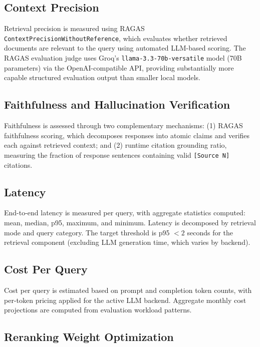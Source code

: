 \documentclass[12pt,a4paper]{report}
\begin{document}
\subsection{Context Precision}

Retrieval precision is measured using RAGAS \texttt{ContextPrecisionWithoutReference}, which evaluates whether retrieved documents are relevant to the query using automated LLM-based scoring. The RAGAS evaluation judge uses Groq's \texttt{llama-3.3-70b-versatile} model (70B parameters) via the OpenAI-compatible API, providing substantially more capable structured evaluation output than smaller local models.

\subsection{Faithfulness and Hallucination Verification}

Faithfulness is assessed through two complementary mechanisms: (1) RAGAS faithfulness scoring, which decomposes responses into atomic claims and verifies each against retrieved context; and (2) runtime citation grounding ratio, measuring the fraction of response sentences containing valid \texttt{[Source N]} citations.

\subsection{Latency}

End-to-end latency is measured per query, with aggregate statistics computed: mean, median, p95, maximum, and minimum. Latency is decomposed by retrieval mode and query category. The target threshold is p95 $< 2$ seconds for the retrieval component (excluding LLM generation time, which varies by backend).

\subsection{Cost Per Query}

Cost per query is estimated based on prompt and completion token counts, with per-token pricing applied for the active LLM backend. Aggregate monthly cost projections are computed from evaluation workload patterns.

\subsection{Reranking Weight Optimization}
\end{document}
